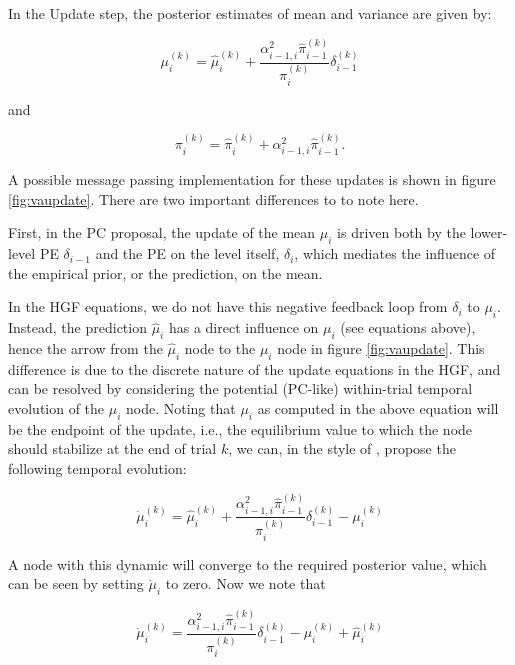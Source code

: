 In the \textsf{Update} step, the posterior estimates of mean and variance are given by:

\begin{equation}
	\mu_i^{(k)} = \hat{\mu}_i^{(k)} + \frac{\alpha_{i-1,i}^2 \hat{\pi}_{i-1}^{(k)}}{\pi_i^{(k)}} \delta_{i-1}^{(k)}
\end{equation}

and

\begin{equation}
	\pi_i^{(k)} = \hat{\pi}_i^{(k)} + \alpha_{i-1,i}^2 \hat{\pi}_{i-1}^{(k)}.
\end{equation}

A possible message passing implementation for these updates is shown in figure \ref{fig:vaupdate}. There are two important differences to \cite{Shipp2016} to note here.\\


First, in the \textsf{PC} proposal, the update of the mean $\mu_i$ is driven both by the lower-level PE $\delta_{i-1}$ and the PE on the level itself, $\delta_i$, which mediates the influence of the empirical prior, or the prediction, on the mean. 

In the HGF equations, we do not have this negative feedback loop from $\delta_i$ to $\mu_i$. Instead, the prediction $\hat{\mu}_i$ has a direct influence on $\mu_i$ (see equations above), hence the arrow from the $\hat{\mu}_i$ node to the $\mu_i$ node in figure \ref{fig:vaupdate}. This difference is due to the discrete nature of the update equations in the HGF, and can be resolved by considering the potential (PC-like) within-trial temporal evolution of the $\mu_i$ node. Noting that $\mu_i$ as computed in the above equation will be the endpoint of the update, i.e., the equilibrium value to which the node should stabilize at the end of trial $k$, we can, in the style of \cite{Bogacz2017}, propose the following temporal evolution:

\begin{equation}
	\dot{\mu}_i^{(k)} = \hat{\mu}_i^{(k)} + \frac{\alpha_{i-1,i}^2 \hat{\pi}_{i-1}^{(k)}}{\pi_i^{(k)}} \delta_{i-1}^{(k)} - \mu_i^{(k)}
\end{equation}

A node with this dynamic will converge to the required posterior value, which can be seen by setting $\dot{\mu}_i$ to zero. Now we note that

\begin{equation}
	\dot{\mu}_i^{(k)} = \frac{\alpha_{i-1,i}^2 \hat{\pi}_{i-1}^{(k)}}{\pi_i^{(k)}} \delta_{i-1}^{(k)} - \mu_i^{(k)} + \hat{\mu}_i^{(k)}
\end{equation}

